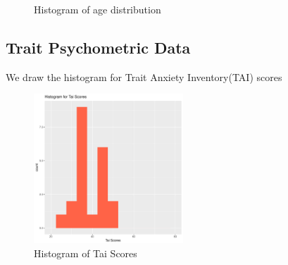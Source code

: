 \documentclass[12pt,epsf]{report}
\begin{document}
\begin{figure}[!htb]
\begin{minipage}[c]{0.5\linewidth}
	\caption{Histogram of age distribution}
	\end{minipage}
\end{figure}

\subsection*{Trait Psychometric Data}
We draw the histogram for Trait Anxiety Inventory(TAI) scores\\
\begin{figure}[!htb]
	\centering
	\includegraphics[width=0.5\textwidth]{tai_plot.pdf}
	\caption{Histogram of Tai Scores}
	\centering
\end{figure}
\newpage
\end{document}
